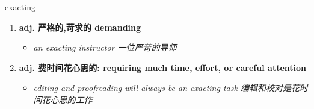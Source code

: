 
\begin{frame}
{\huge exacting}
\begin{center}
\begin{enumerate}\Large
  \item \textbf{adj. 严格的,苛求的 demanding}
  \begin{itemize}
    \item \em{\Large{an exacting instructor 一位严苛的导师}}
  \end{itemize}
  \item \textbf{adj. 费时间花心思的: requiring much time, effort, or careful attention}
  \begin{itemize}
    \item \em{\Large{editing and proofreading will always be an exacting task 编辑和校对是花时间花心思的工作}}
  \end{itemize}
\end{enumerate}
\end{center}
\end{frame}
